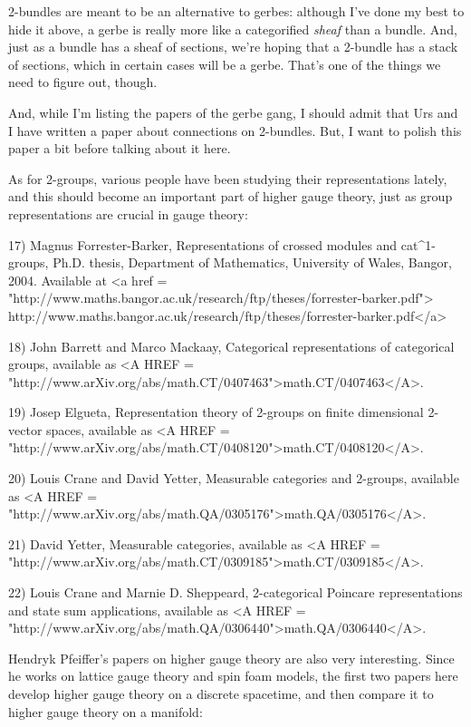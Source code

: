 2-bundles are meant to be an alternative to gerbes: although I've done
my best to hide it above, a gerbe is really more like a categorified
\emph{sheaf} than a bundle.  And, just as a bundle has a sheaf of
sections, we're hoping that a 2-bundle has a stack of sections, which
in certain cases will be a gerbe.  That's one of the things we need to
figure out, though.

And, while I'm listing the papers of the gerbe gang, I should admit that 
Urs and I have written a paper about connections on 2-bundles.  But, I
want to polish this paper a bit before talking about it here.

As for 2-groups, various people have been studying their representations
lately, and this should become an important part of higher gauge theory, 
just as group representations are crucial in gauge theory:

17) Magnus Forrester-Barker, Representations of crossed modules and 
cat^{1}-groups, Ph.D. thesis, Department of Mathematics, University of
Wales, Bangor, 2004.  Available at 
<a href = "http://www.maths.bangor.ac.uk/research/ftp/theses/forrester-barker.pdf">
http://www.maths.bangor.ac.uk/research/ftp/theses/forrester-barker.pdf</a>

18) John Barrett and Marco Mackaay, Categorical representations of 
categorical groups, available as <A HREF = "http://www.arXiv.org/abs/math.CT/0407463">math.CT/0407463</A>.

19) Josep Elgueta, Representation theory of 2-groups on finite dimensional
2-vector spaces, available as <A HREF = "http://www.arXiv.org/abs/math.CT/0408120">math.CT/0408120</A>.
 
20) Louis Crane and David Yetter, Measurable categories and 2-groups,
available as 
<A HREF = "http://www.arXiv.org/abs/math.QA/0305176">math.QA/0305176</A>.

21) David Yetter, Measurable categories, 
available as
<A HREF = "http://www.arXiv.org/abs/math.CT/0309185">math.CT/0309185</A>.

22) Louis Crane and Marnie D. Sheppeard, 2-categorical Poincare
representations and state sum applications, available as
<A HREF = "http://www.arXiv.org/abs/math.QA/0306440">math.QA/0306440</A>.

Hendryk Pfeiffer's papers on higher gauge theory are also very 
interesting.  Since he works on lattice gauge theory and spin foam
models, the first two papers here develop higher gauge theory on a
discrete spacetime, and then compare it to higher gauge theory on a 
manifold:

